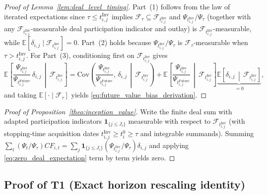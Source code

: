 \begin{proof}[Proof of Lemma~\ref{lem:deal_level_timing}]
Part~(1) follows from the law of iterated expectations since $\tau \le t_{i,j}^{\mathrm{Inv}}$ implies $\mathcal{F}_\tau \subseteq \mathcal{F}_{t_{i,j}^{\mathrm{Inv}}}$ and $\Psi_{t_{i,j}^{\mathrm{Inv}}}/\Psi_\tau$ (together with any $\mathcal{F}_{t_{i,j}^{\mathrm{Inv}}}$-measurable deal participation indicator and outlay) is $\mathcal{F}_{t_{i,j}^{\mathrm{Inv}}}$-measurable, while $\mathbb{E}[\delta_{i,j}\mid\mathcal{F}_{t_{i,j}^{\mathrm{Inv}}}] = 0$.
Part~(2) holds because $\Psi_{t_{i,j}^{\mathrm{Inv}}}/\Psi_\tau$ is $\mathcal{F}_\tau$-measurable when $\tau > t_{i,j}^{\mathrm{Inv}}$.
For Part~(3), conditioning first on $\mathcal{F}_{t_{i,j}^{\mathrm{Inv}}}$ gives
\[
\mathbb{E}\!\left[\frac{\Psi_{t_{i,j}^{\mathrm{Inv}}}}{\Psi_{t_{i,j}^{\mathrm{Future}}}}\,\delta_{i,j} \,\middle|\, \mathcal{F}_{t_{i,j}^{\mathrm{Inv}}}\right]
= \mathrm{Cov}\!\left(\frac{\Psi_{t_{i,j}^{\mathrm{Inv}}}}{\Psi_{t_{i,j}^{\mathrm{Future}}}},\,\delta_{i,j} \,\middle|\, \mathcal{F}_{t_{i,j}^{\mathrm{Inv}}}\right)
+ \mathbb{E}\!\left[\frac{\Psi_{t_{i,j}^{\mathrm{Inv}}}}{\Psi_{t_{i,j}^{\mathrm{Future}}}} \,\middle|\, \mathcal{F}_{t_{i,j}^{\mathrm{Inv}}}\right]
\underbrace{\mathbb{E}\!\left[\delta_{i,j} \,\middle|\, \mathcal{F}_{t_{i,j}^{\mathrm{Inv}}}\right]}_{=0},
\]
and taking $\mathbb{E}[\cdot \mid \mathcal{F}_\tau]$ yields \eqref{eq:future_value_bias_derivation}.
\end{proof}

\begin{proof}[Proof of Proposition~\ref{theo:inception_value}]
Write the finite deal sum with adapted participation indicators $\mathbf{1}_{\{j \le J_i\}}$ measurable with respect to $\mathcal{F}_{t_{i,j}^{\mathrm{Inv}}}$ (with stopping-time acquisition dates $t_{i,j}^{\mathrm{Inv}} \ge t_i^0 \ge \tau$ and integrable summands). Summing $\sum_t (\Psi_t/\Psi_\tau)CF_{i,t} = \sum_{j} \mathbf{1}_{\{j \le J_i\}}(\Psi_{t_{i,j}^{\mathrm{Inv}}}/\Psi_\tau)\delta_{i,j}$ and applying \eqref{eq:zero_deal_expectation} term by term yields zero.
\end{proof}

\subsection{Proof of T1 (Exact horizon rescaling identity)}
\label{sec:proof_T1}

